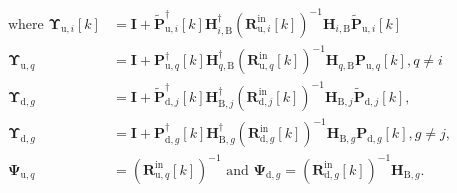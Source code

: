 \documentclass[10pt,journal]{IEEEtran}
\newcommand{\bracket}[1]{{\left [{#1}\right ]}}
\newcommand{\PqB}{\mathbf{P}_{\textrm{u},q}\bracket{k}}
\newcommand{\PqBH}{\mathbf{P}^\dagger_{\textrm{u},q}\bracket{k}}
\newcommand{\PBg}{\mathbf{P}_{\textrm{d},g}\bracket{k}}
\newcommand{\PBgH}{\mathbf{P}^\dagger_{\textrm{d},g}\bracket{k}}
\newcommand{\Rinjin}{\left( \mathbf{R}^{\textrm{in}}_{\mathrm{d},j}\bracket{k}\right)^{-1}}
\newcommand{\Ringin}{\left( \mathbf{R}^{\textrm{in}}_{\mathrm{d},g}\bracket{k}\right)^{-1}}
\newcommand{\Riniin}{\left( \mathbf{R}^\mathrm{in}_{\mathrm{u},i}\bracket{k}\right)^{-1}}
\newcommand{\Rinqin}{\left( \mathbf{R}^{\textrm{in}}_{\mathrm{u},q}\bracket{k}\right)^{-1}}
\newcommand{\HBj}{\mathbf{H}_{\textrm{B},j}}
\newcommand{\HBjH}{\mathbf{H}^\dagger_{\textrm{B},j}}
\newcommand{\HBg}{\mathbf{H}_{\textrm{B},g}}
\newcommand{\HBgH}{\mathbf{H}^\dagger_{\textrm{B},g}}
\newcommand{\HqB}{\mathbf{H}_{q,\textrm{B}}}
\newcommand{\HqBH}{\mathbf{H}^\dagger_{q,\textrm{B}}}
\theoremstyle{definition}
\begin{document}
\begin{align}
\textrm{where }\boldsymbol{\Upsilon}_{\textrm{u},i}\bracket{k}&=\mathbf{I}+\widetilde{\mathbf{P}}^\dagger_{\textrm{u},i}\bracket{k}\mathbf{H}^\dagger_{i,\textrm{B}}\Riniin\mathbf{H}_{i,\textrm{B}}\widetilde{\mathbf{P}}_{\textrm{u},i}\bracket{k}\nonumber\\
\boldsymbol{\Upsilon}_{\textrm{u},q}&=\mathbf{I}+\PqBH\HqBH\Rinqin \HqB\PqB,q\neq i\nonumber\\
\boldsymbol{\Upsilon}_{\textrm{d},g}&=\mathbf{I}+ \widetilde{\mathbf{P}}^\dagger_{\textrm{d},j}\bracket{k}\HBjH \Rinjin\HBj\widetilde{\mathbf{P}}_{\textrm{d},j}\bracket{k},\nonumber\\
\boldsymbol{\Upsilon}_{\textrm{d},g}&= \mathbf{I}+\PBgH\HBgH\Ringin\HBg\PBg, g\neq j,\nonumber\\
\boldsymbol{\Psi}_{\textrm{u},q}&=\Rinqin\textrm{ and }\boldsymbol{\Psi}_{\textrm{d},g}=\Ringin\HBg.\nonumber
\end{align}\normalsize
 %
\iffalse
\end{document}
